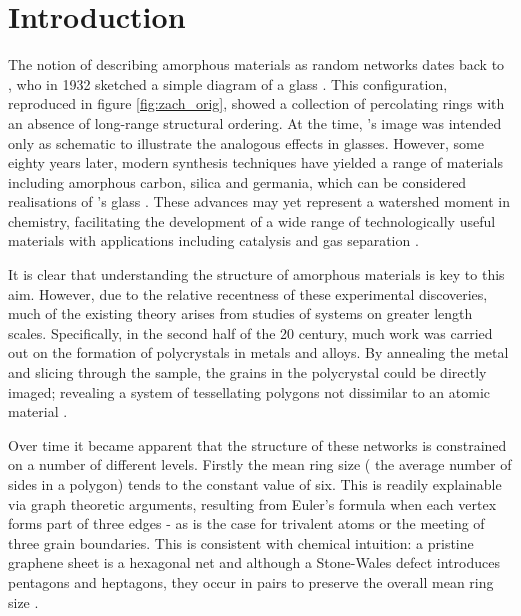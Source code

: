 \chapter{Introduction}
\label{ch:intro}


The notion of describing amorphous materials as random networks dates back to \zach, who in 1932 sketched a simple diagram of a \td{} glass \cite{Zachariasen1932}.
This configuration, reproduced in figure \ref{fig:zach_orig}, showed a collection of percolating rings with an absence of long\--range structural ordering.
At the time, \zach's image was intended only as schematic to illustrate the analogous effects in \thd{} glasses.
However, some eighty years later, modern synthesis techniques have yielded a range of \td{} materials including amorphous carbon, silica and germania, which can be considered realisations of \zach's glass \cite{Kotakoski2011,Robertson2012,Huang2012,Lichtenstein2012a,Shaikhutdinov2013,Lewandowski2018,Lewandowski2019}.
These advances may yet represent a watershed moment in chemistry, facilitating the development of a wide range of technologically useful materials with applications including catalysis and gas separation \cite{Trogadas2014,Sun2015a,Buchner2017}.

It is clear that understanding the structure of amorphous materials is key to this aim.
However, due to the relative recentness of these experimental discoveries, much of the existing theory arises from studies of systems on greater length scales.
Specifically, in the second half of the 20\th{} century, much work was carried out on the formation of polycrystals in metals and alloys.
By annealing the metal and slicing through the sample, the grains in the polycrystal could be directly imaged; revealing a system of tessellating polygons not dissimilar to an atomic material \cite{Beck1954,Dunn1957}.

Over time it became apparent that the structure of these networks is constrained on a number of different levels.
Firstly the mean ring size (\ie{} the average number of sides in a polygon) tends to the constant value of six.
This is readily explainable via graph theoretic arguments, resulting from Euler's formula when each vertex forms part of three edges - as is the case for trivalent atoms or the meeting of three grain boundaries.
This is consistent with chemical intuition: a pristine graphene sheet is a hexagonal net and although a Stone\--Wales defect introduces pentagons and heptagons, they occur in pairs to preserve the overall mean ring size \cite{Stone1986}.

